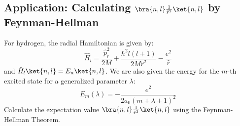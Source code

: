 \hr
\subsection{Application: Calculating $\bra{n, l}\frac{1}{\hat
r^2}\ket{n, l}$ by Feynman-Hellman}

\begin{problem}
  For hydrogen, the radial Hamiltonian is given by:
  \begin{equation} \label{eq:hydrogen_H_l}
    \hat H_l = \frac{\hat p_r^2}{2M} + \frac{\hbar^2
    l(l+1)}{2M\hat r^2} - \frac{e^2}{\hat r}
  \end{equation}
  and $\hat H_l \ket{n,l} = E_n \ket{n, l}$. We are also given the
  energy for the $m$-th excited state for a generalized parameter $\lambda$:
  \begin{equation} \label{eq:hydrogen_E_m_lambda}
    E_m(\lambda) = -\frac{e^2}{2a_0(m+\lambda+1)^2}
  \end{equation}
  Calculate the expectation value $\bra{n, l}\frac{1}{\hat
  r^2}\ket{n, l}$ using the Feynman-Hellman Theorem.
\end{problem}

